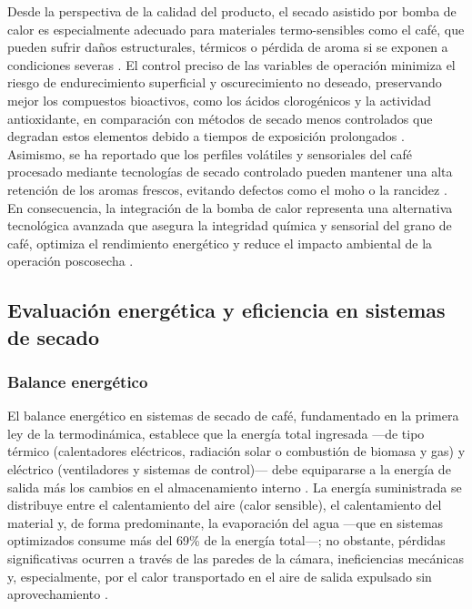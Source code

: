 Desde la perspectiva de la calidad del producto, el secado asistido por bomba de calor es especialmente adecuado para materiales termo-sensibles como el café, que pueden sufrir daños estructurales, térmicos o pérdida de aroma si se exponen a condiciones severas \parencite{salehi_recent_2021, fauzi_influence_2024}. El control preciso de las variables de operación minimiza el riesgo de endurecimiento superficial y oscurecimiento no deseado, preservando mejor los compuestos bioactivos, como los ácidos clorogénicos y la actividad antioxidante, en comparación con métodos de secado menos controlados que degradan estos elementos debido a tiempos de exposición prolongados \parencite{cheng_evaluation_2019}. Asimismo, se ha reportado que los perfiles volátiles y sensoriales del café procesado mediante tecnologías de secado controlado pueden mantener una alta retención de los aromas frescos, evitando defectos como el moho o la rancidez \parencite{salehi_recent_2021}. En consecuencia, la integración de la bomba de calor representa una alternativa tecnológica avanzada que asegura la integridad química y sensorial del grano de café, optimiza el rendimiento energético y reduce el impacto ambiental de la operación poscosecha \parencite{salehi_recent_2021, yahya_development_2023}.

\subsection{Evaluación energética y eficiencia en sistemas de secado}

\subsubsection{Balance energético}

El balance energético en sistemas de secado de café, fundamentado en la primera ley 
de la termodinámica, establece que la energía total ingresada —de tipo térmico 
(calentadores eléctricos, radiación solar o combustión de biomasa y gas) y eléctrico 
(ventiladores y sistemas de control)— debe equipararse a la energía de salida más 
los cambios en el almacenamiento interno 
\parencite{leonardo_barcelos_mateus_modeling_2021, rabello_modeling_2021, 
suherman_energy_2020, abbaspour-gilandeh_effect_2021, arifin_controlling_2024, 
yuwana_free_2025}. La energía suministrada se distribuye entre el calentamiento del 
aire (calor sensible), el calentamiento del material y, de forma predominante, la 
evaporación del agua —que en sistemas optimizados consume más del 69\% de la energía 
total—; no obstante, pérdidas significativas ocurren a través de las paredes de la 
cámara, ineficiencias mecánicas y, especialmente, por el calor transportado en el 
aire de salida expulsado sin aprovechamiento 
\parencite{burdo_energy-efficient_2025, santana_economic_2020, 
abbaspour-gilandeh_effect_2021, li_study_2021}.

